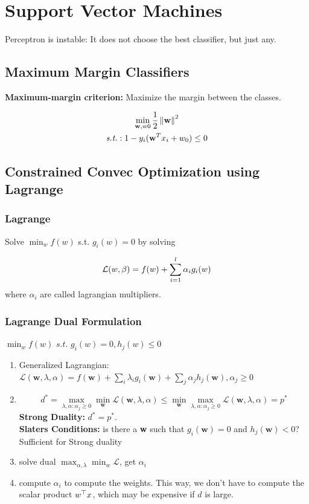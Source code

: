 \section{Support Vector Machines}
Perceptron is instable: It does not choose the best classifier, but just any.

\subsection{Maximum Margin Classifiers}
\textbf{Maximum-margin criterion: } Maximize the margin between the classes.

\begin{equation*}
	\begin{gathered}
		\min_{\mathbf w, w0}\frac{1}{2}\left\lVert\mathbf w\right\rVert^2 \\
		\textit{s.t.}: 1 - y_i(\mathbf w^Tx_i + w_0) \leq 0
	\end{gathered}
\end{equation*}

\subsection{Constrained Convec Optimization using Lagrange}
\subsubsection{Lagrange}
Solve
$\min_w f(w)$ s.t. $ g_i(w) = 0$ by solving

$$
	\mathcal L(w, \beta) = f(w) + \sum_{i = 1}^{l} \alpha_i g_i(w)
$$
where $\alpha_i$ are called lagrangian multipliers.

\subsubsection{Lagrange Dual Formulation}
$\min_w f(w) \textit{ s.t. } g_i(w) = 0, h_j(w) \leq 0$\\
\begin{enumerate}
  \item  Generalized Lagrangian: $\mathcal L(\mathbf w, \lambda, \alpha) = f(\mathbf w) + \sum_i\lambda_ig_i(\mathbf w) + \sum_{j} \alpha_jh_j(\mathbf w), \alpha_j\geq 0$ \
  \item  
  $$
d^*=\max_{\lambda, \alpha: \alpha_j \geq 0}\min_\textbf{w}\mathcal{L}(\mathbf{w}, \lambda, \alpha) \leq \min_\textbf{w}\max_{\lambda, \alpha: \alpha_j \geq 0} \mathcal{L}(\mathbf{w}, \lambda, \alpha) = p^*
$$
\textbf{Strong Duality: } $d^* = p^*$. \\
\textbf{Slaters Conditions: } is there a \textbf{w} such that $g_i(\textbf{w}) = 0$ and $h_j(\textbf{w}) < 0$? Sufficient for Strong duality
  \item solve dual $\max_{\alpha, \lambda} \min_w  \mathcal L$, get $\alpha_i$
  \item compute $\alpha_i$ to compute the weights. This way, we don't have to compute the scalar product ${w}^\top x $, which may be expensive if $d$ is large.
\end{enumerate}

